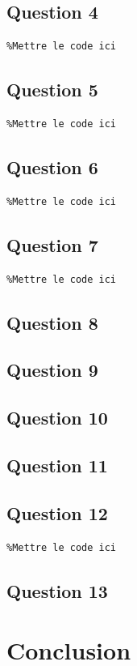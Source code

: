 \documentclass[a4paper,11pt]{article}
\begin{document}
\subsection{Question 4}
\begin{verbatim}
%Mettre le code ici
\end{verbatim}

\subsection{Question 5}
\begin{verbatim}
%Mettre le code ici
\end{verbatim}

\subsection{Question 6}
\begin{verbatim}
%Mettre le code ici
\end{verbatim}

\subsection{Question 7}
\begin{verbatim}
%Mettre le code ici
\end{verbatim}

\subsection{Question 8}

\subsection{Question 9}

\subsection{Question 10}

\subsection{Question 11}

\subsection{Question 12}
\begin{verbatim}
%Mettre le code ici
\end{verbatim}

\subsection{Question 13}

\section{Conclusion}
\end{document}
